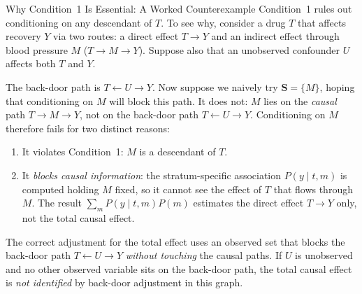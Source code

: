 \documentclass[master.tex]{subfiles}
\begin{document}
\begin{warn}{Why Condition~1 Is Essential: A Worked Counterexample}
Condition~1 rules out conditioning on any descendant of $T$.  To see why,
consider a drug $T$ that affects recovery $Y$ via two routes: a direct effect
$T \to Y$ and an indirect effect through blood pressure $M$ ($T \to M \to Y$).
Suppose also that an unobserved confounder $U$ affects both $T$ and $Y$.

\begin{center}
\end{center}

\noindent
The back-door path is $T \leftarrow U \to Y$.  Now suppose we naively try
$\mathbf{S} = \{M\}$, hoping that conditioning on $M$ will block this path.
It does not: $M$ lies on the \emph{causal} path $T \to M \to Y$, not on the
back-door path $T \leftarrow U \to Y$.  Conditioning on $M$ therefore fails
for two distinct reasons:
\begin{enumerate}
  \item It violates Condition~1: $M$ is a descendant of $T$.
  \item It \emph{blocks causal information}: the stratum-specific association
        $P(y \mid t, m)$ is computed holding $M$ fixed, so it cannot see the
        effect of $T$ that flows through $M$.  The result $\sum_m P(y \mid t,m)P(m)$
        estimates the direct effect $T \to Y$ only, not the total causal effect.
\end{enumerate}
The correct adjustment for the total effect uses an observed set that blocks the
back-door path $T \leftarrow U \to Y$ \emph{without touching} the causal paths.
If $U$ is unobserved and no other observed variable sits on the back-door path,
the total causal effect is \emph{not identified} by back-door adjustment in this graph.
\end{warn}
\end{document}
